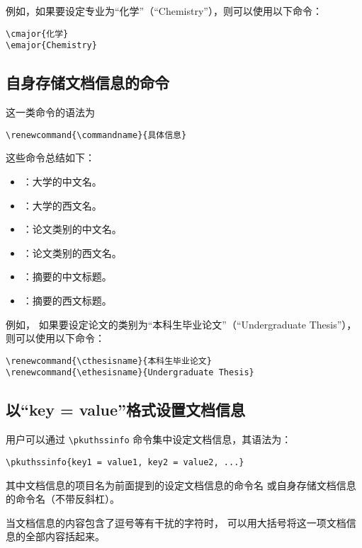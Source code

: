 例如，如果要设定专业为“化学”（“Chemistry”），则可以使用以下命令：
\begin{Verbatim}[frame = single]
\cmajor{化学}
\emajor{Chemistry}
\end{Verbatim}

\subsection{自身存储文档信息的命令}

这一类命令的语法为
\begin{Verbatim}[frame = single]
% commandname 为具体的命令名。
\renewcommand{\commandname}{具体信息}
\end{Verbatim}

这些命令总结如下：
\begin{itemize}
	\item \texttt{\bfseries\string\cuniversity}：大学的中文名。
	\item \texttt{\bfseries\string\euniversity}：大学的西文名。
	\item \texttt{\bfseries\string\cthesisname}：论文类别的中文名。
	\item \texttt{\bfseries\string\ethesisname}：论文类别的西文名。
	\item \texttt{\bfseries\string\cabstractname}：摘要的中文标题。
	\item \texttt{\bfseries\string\eabstractname}：摘要的西文标题。
\end{itemize}

例如，
如果要设定论文的类别为“本科生毕业论文”（“Undergraduate Thesis”），
则可以使用以下命令：
\begin{Verbatim}[frame = single]
\renewcommand{\cthesisname}{本科生毕业论文}
\renewcommand{\ethesisname}{Undergraduate Thesis}
\end{Verbatim}

\subsection{以“key = value”格式设置文档信息}

用户可以通过 \verb|\pkuthssinfo| 命令集中设定文档信息，其语法为：
\begin{Verbatim}[frame = single]
% key1、key2、value1、value2 等为具体文档信息的项目名和内容。
\pkuthssinfo{key1 = value1, key2 = value2, ...}
\end{Verbatim}
其中文档信息的项目名为前面提到的设定文档信息的命令名
或自身存储文档信息的命令名（不带反斜杠）。

当文档信息的内容包含了逗号等有干扰的字符时，
可以用大括号将这一项文档信息的全部内容括起来。

